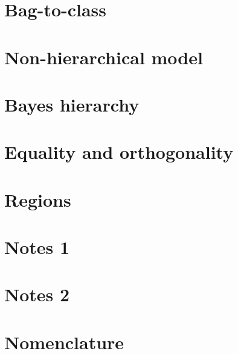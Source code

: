 \documentclass[preprint,12pt]{elsarticle}
\begin{document}
\section{Bag-to-class} \label{sec:Bag_vs_Class}


\section{Non-hierarchical model} \label{sec:Non_Hierarchical}


\section{Bayes hierarchy} \label{sec:Bayes_hierarchy}


\section{Equality and orthogonality} \label{sec:Eq_Orth}


\section{Regions} \label{sec:Regions}


\section{Notes 1} \label{sec:Notes_1}


\section{Notes 2} \label{sec:Notes_2}


\clearpage
\section{Nomenclature} \label{sec:Nomenclature}



 

\end{document}
